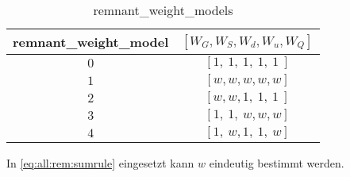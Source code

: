 \begin{table}
  \begin{center}
    \begin{tabular}{cc}
      remnant\_weight\_model&$[W_G,W_S,W_d,W_u,W_Q]$\\
      \midrule
      $0$&$[1,\ 1,\ 1,\ 1,\ 1\ ]$\\
      $1$&$[w,w,w,w,w]$\\
      $2$&$[w,w,1,\ 1,\ 1\ ]$\\
      $3$&$[1,\ 1,\ w,w,w]$\\
      $4$&$[1,\ w,1,\ 1,\ w]$
    \end{tabular}
  \end{center}
  \caption{\label{tab:all:rem:weight_models}remnant\_weight\_models}
\end{table}
In \eqref{eq:all:rem:sumrule} eingesetzt kann $w$ eindeutig bestimmt werden.


